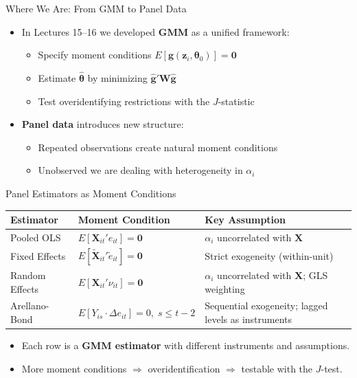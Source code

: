 \documentclass[aspectratio=169, handout]{beamer}
\numberwithin{equation}{section}
\begin{document}
\begin{frame}{Where We Are: From GMM to Panel Data}
\begin{itemize}
\item In Lectures 15--16 we developed \textbf{GMM} as a unified framework:
\begin{itemize}
\item Specify moment conditions $E[\bm{g}(\bm{z}_i,\bm{\theta}_0)]=\bm{0}$
\item Estimate $\hat{\bm{\theta}}$ by minimizing $\hat{\bm{g}}'\bm{W}\hat{\bm{g}}$
\item Test overidentifying restrictions with the $J$-statistic
\end{itemize}\pause
\item \textbf{Panel data} introduces new structure:
\begin{itemize}
\item Repeated observations create natural moment conditions
\item Unobserved we are dealing with heterogeneity in $\alpha_i$
\end{itemize}
\end{itemize}
\end{frame}

\begin{frame}{Panel Estimators as Moment Conditions}
\centering
\small
\begin{tabular}{@{}llp{3.8cm}@{}}
\toprule
\textbf{Estimator} & \textbf{Moment Condition} & \textbf{Key Assumption} \\
\midrule
Pooled OLS & $E[\bm{X}_{it}' e_{it}]=\bm{0}$ & $\alpha_i$ uncorrelated with $\bm{X}$ \\[4pt]
Fixed Effects & $E[\tilde{\bm{X}}_{it}'\tilde{e}_{it}]=\bm{0}$ & Strict exogeneity (within-unit) \\[4pt]
Random Effects & $E[\bm{X}_{it}'\nu_{it}]=\bm{0}$ & $\alpha_i$ uncorrelated with $\bm{X}$; GLS weighting \\[4pt]
Arellano-Bond & $E[Y_{is}\cdot\Delta e_{it}]=0,\; s\leq t\!-\!2$ & Sequential exogeneity; lagged levels as instruments \\
\bottomrule
\end{tabular}
\vspace{6pt}

\begin{itemize}
\item Each row is a \textbf{GMM estimator} with different instruments and assumptions.\pause
\item More moment conditions $\Rightarrow$ overidentification $\Rightarrow$ testable with the $J$-test.
\end{itemize}
\end{frame}
\end{document}
